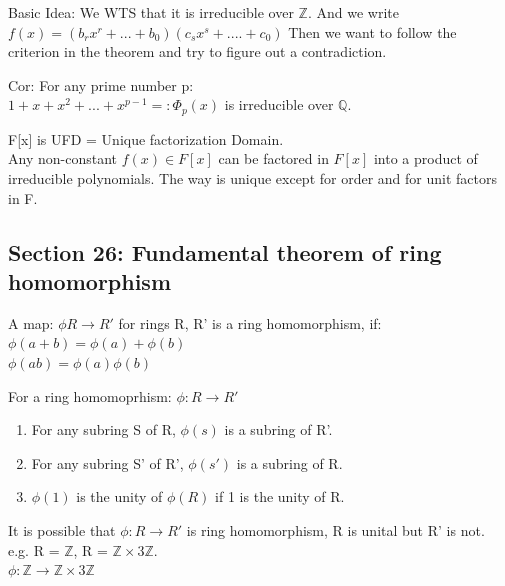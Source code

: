 \documentclass{article}
\newcommand\Z{\ensuremath{\mathbb{Z}}}
\newcommand\Q{\ensuremath{\mathbb{Q}}}
\begin{document}
\begin{Proof}
    Basic Idea: We WTS that it is irreducible over $\Z.$ And we write $f(x) = (b_rx^r + ...+ b_0)(c_sx^s +....+c_0)$ Then we want to follow the criterion in the theorem and try to figure out a contradiction. 
\end{Proof}

\begin{note}
    Cor: For any prime number p:
    \\ $1+x+x^2+...+x^{p-1} =: \Phi_p(x)$ is irreducible over $\Q$. 
\end{note}

\begin{theorem}
    F[x] is UFD = Unique factorization Domain. 
    \\ Any non-constant $f(x)\in F[x]$ can be factored in $F[x]$ into a product of irreducible polynomials.
    The way is unique except for order and for unit factors in F. 
\end{theorem}
\newpage

\subsection{Section 26: Fundamental theorem of ring homomorphism}
\begin{Def}
    A map: $\phi R \rightarrow R'$ for rings R, R' is a ring homomorphism, if:
    \\$\phi(a+b) = \phi(a) + \phi(b)$
    \\$\phi(ab) = \phi(a)  \phi(b)$
    
\end{Def}

\begin{theorem}
    For a ring homomoprhism: $\phi: R \rightarrow R'$
    \begin{enumerate}
        \item For any subring S of R, $\phi(s)$  is a subring of R'.
        \item For any subring S' of R', $\phi(s')$ is a subring of R.
        \item $\phi(1)$ is the unity of $\phi(R)$ if 1 is the unity of R. 
    \end{enumerate}

\end{theorem}

\begin{note}
        It is possible that $\phi: R \rightarrow R'$ is ring homomorphism, R is unital but R' is not.
        \\e.g. R = $\Z$, R = $\Z \times 3\Z$.
        \\ $\phi: \Z \rightarrow \Z \times 3\Z$
\end{note}
\end{document}
